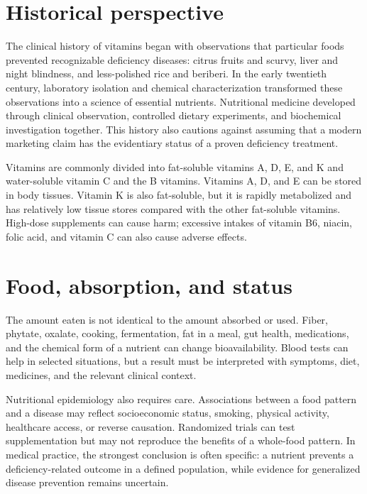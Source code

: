 \section{Historical perspective}
The clinical history of vitamins began with observations that particular foods prevented recognizable deficiency diseases: citrus fruits and scurvy, liver and night blindness, and less-polished rice and beriberi. In the early twentieth century, laboratory isolation and chemical characterization transformed these observations into a science of essential nutrients. Nutritional medicine developed through clinical observation, controlled dietary experiments, and biochemical investigation together. This history also cautions against assuming that a modern marketing claim has the evidentiary status of a proven deficiency treatment. \cite{historyNutrition,historyVitaminA}

Vitamins are commonly divided into fat-soluble vitamins A, D, E, and K and water-soluble vitamin C and the B vitamins. Vitamins A, D, and E can be stored in body tissues. Vitamin K is also fat-soluble, but it is rapidly metabolized and has relatively low tissue stores compared with the other fat-soluble vitamins. High-dose supplements can cause harm; excessive intakes of vitamin B6, niacin, folic acid, and vitamin C can also cause adverse effects. \cite{odsA,odsD,odsE,odsK,odsSafety}

\section{Food, absorption, and status}
The amount eaten is not identical to the amount absorbed or used. Fiber, phytate, oxalate, cooking, fermentation, fat in a meal, gut health, medications, and the chemical form of a nutrient can change bioavailability. Blood tests can help in selected situations, but a result must be interpreted with symptoms, diet, medicines, and the relevant clinical context. \cite{odsIron,odsD,odsK}

Nutritional epidemiology also requires care. Associations between a food pattern and a disease may reflect socioeconomic status, smoking, physical activity, healthcare access, or reverse causation. Randomized trials can test supplementation but may not reproduce the benefits of a whole-food pattern. In medical practice, the strongest conclusion is often specific: a nutrient prevents a deficiency-related outcome in a defined population, while evidence for generalized disease prevention remains uncertain. \cite{historyNutrition}

